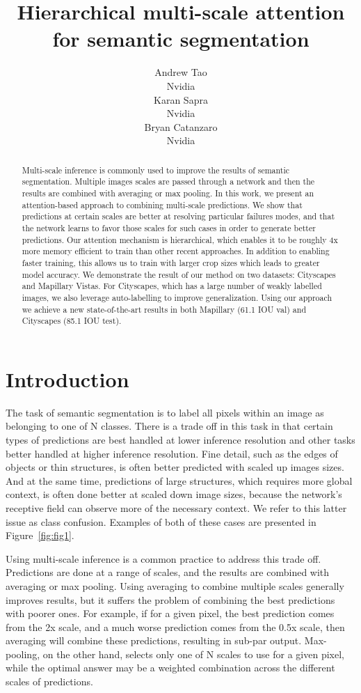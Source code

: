 \documentclass{article}
\title{Hierarchical multi-scale attention for semantic segmentation}
\author{
  Andrew Tao \\
  Nvidia\\
\And
 Karan Sapra \\
 Nvidia\\
   \And
 Bryan Catanzaro \\
 Nvidia\\
}
\begin{document}
\maketitle

\begin{abstract}
Multi-scale inference is commonly used to improve the results of semantic segmentation. Multiple images scales are passed through a network and then the results are combined with averaging or max pooling. In this work, we present an attention-based approach to combining multi-scale predictions. We show that predictions at certain scales are better at resolving particular failures modes, and that the network learns to favor those scales for such cases in order to generate better predictions. Our attention mechanism is hierarchical, which enables it to be roughly $4$x more memory efficient to train than other recent approaches. In addition to enabling faster training, this allows us to train with larger crop sizes which leads to greater model accuracy. We demonstrate the result of our method on two datasets: Cityscapes and Mapillary Vistas. For Cityscapes, which has a large number of weakly labelled images, we also leverage auto-labelling to improve generalization. Using our approach we achieve a new state-of-the-art results in both Mapillary (61.1 IOU val) and Cityscapes (85.1 IOU test). 
\end{abstract}




\section{Introduction}
The task of semantic segmentation is to label all pixels within an image as belonging to one of N classes. There is a trade off in this task in that certain types of predictions are best handled at lower inference resolution and other tasks better handled at higher inference resolution. Fine detail, such as the edges of objects or thin structures, is often better predicted with scaled up images sizes. And at the same time, predictions of large structures, which requires more global context, is often done better at scaled down image sizes, because the network's receptive field can observe more of the necessary context. We refer to this latter issue as class confusion. Examples of both of these cases are presented in Figure~\ref{fig:fig1}.

Using multi-scale inference is a common practice to address this trade off. Predictions are done at a range of scales, and the results are combined with averaging or max pooling. Using averaging to combine multiple scales generally improves results, but it suffers the problem of combining the best predictions with poorer ones. For example, if for a given pixel, the best prediction comes from the 2x scale, and a much worse prediction comes from the 0.5x scale, then averaging will combine these predictions, resulting in sub-par output. Max-pooling, on the other hand, selects only one of N scales to use for a given pixel, while the optimal answer may be a weighted combination across the different scales of predictions.
\end{document}
